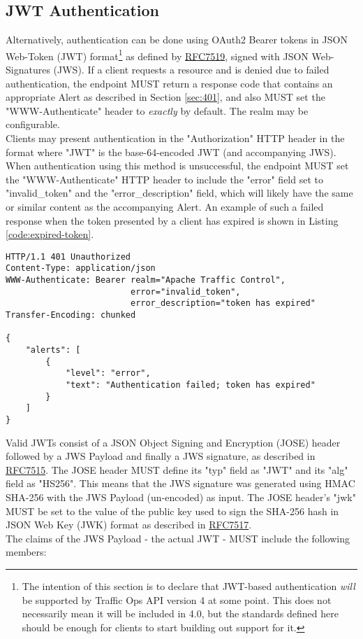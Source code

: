 \subsection{JWT Authentication}
Alternatively, authentication can be done using OAuth2 Bearer tokens in JSON
Web-Token (JWT) format\footnote{The intention of this section is to declare that
JWT-based authentication \emph{will} be supported by Traffic Ops API version 4
at some point. This does not necessarily mean it will be included in 4.0, but
the standards defined here should be enough for clients to start building out
support for it.} as defined by
\href{https://tools.ietf.org/html/rfc7519}{RFC7519}, signed with JSON
Web-Signatures (JWS). If a client requests a resource and is denied due to
failed authentication, the endpoint MUST return a 
response code that contains an appropriate Alert as described in Section
\ref{sec:401}, and also MUST set the "WWW-Authenticate" header to \emph{exactly}
 by default. The realm may be
configurable.\\
Clients may present authentication in the "Authorization" HTTP header in the
format  where "JWT" is the base-64-encoded JWT (and
accompanying JWS). When authentication using this method is unsuccessful, the
endpoint MUST set the "WWW-Authenticate" HTTP header to include the "error"
field set to "invalid\_token" and the "error\_description" field, which will
likely have the same or similar content as the accompanying Alert. An example of
such a failed response when the token presented by a client has expired is shown
in Listing \ref{code:expired-token}.

\begin{codelisting}
\label{code:expired-token}
\begin{verbatim}
HTTP/1.1 401 Unauthorized
Content-Type: application/json
WWW-Authenticate: Bearer realm="Apache Traffic Control",
                         error="invalid_token",
                         error_description="token has expired"
Transfer-Encoding: chunked

{
	"alerts": [
		{
			"level": "error",
			"text": "Authentication failed; token has expired"
		}
	]
}
\end{verbatim}
\end{codelisting}

Valid JWTs consist of a JSON Object Signing and Encryption (JOSE) header
followed by a JWS Payload and finally a JWS signature, as described in
\href{https://tools.ietf.org/html/rfc7515}{RFC7515}. The JOSE header MUST define
its "typ" field as "JWT" and its "alg" field as "HS256". This means that the JWS
signature was generated using HMAC SHA-256 with the JWS Payload (un-encoded) as
input. The JOSE header's "jwk" MUST be set to the value of the public key used
to sign the SHA-256 hash in JSON Web Key (JWK) format as described in
\href{https://tools.ietf.org/html/rfc7517}{RFC7517}.\\
The claims of the JWS Payload - the actual JWT - MUST include the following
members:

